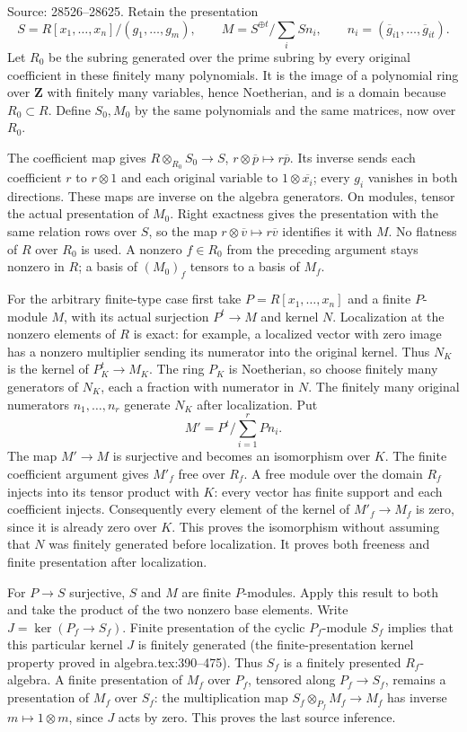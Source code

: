 Source: 28526--28625. Retain the presentation \[
 S=R[x_1,\ldots,x_n]/(g_1,\ldots,g_m),\qquad
 M=S^{\oplus t}/\sum_i S n_i,\qquad
 n_i=(\overline g_{i1},\ldots,\overline g_{it}).
\] Let \(R_0\) be the subring generated over the prime subring by every original coefficient in these finitely many polynomials. It is the image of a polynomial ring over \(\mathbf Z\) with finitely many variables, hence Noetherian, and is a domain because \(R_0\subset R\). Define \(S_0,M_0\) by the same polynomials and the same matrices, now over \(R_0\).

The coefficient map gives \(R\otimes_{R_0}S_0\to S\), \(r\otimes \overline p\mapsto r\overline p\). Its inverse sends each coefficient \(r\) to \(r\otimes1\) and each original variable to \(1\otimes\overline{x_i}\); every \(g_i\) vanishes in both directions. These maps are inverse on the algebra generators. On modules, tensor the actual presentation of \(M_0\). Right exactness gives the presentation with the same relation rows over \(S\), so the map \(r\otimes\overline v\mapsto r\overline v\) identifies it with \(M\). No flatness of \(R\) over \(R_0\) is used. A nonzero \(f\in R_0\) from the preceding argument stays nonzero in \(R\); a basis of \((M_0)_f\) tensors to a basis of \(M_f\).

For the arbitrary finite-type case first take \(P=R[x_1,\ldots,x_n]\) and a finite \(P\)-module \(M\), with its actual surjection \(P^t\to M\) and kernel \(N\). Localization at the nonzero elements of \(R\) is exact: for example, a localized vector with zero image has a nonzero multiplier sending its numerator into the original kernel. Thus \(N_K\) is the kernel of \(P_K^t\to M_K\). The ring \(P_K\) is Noetherian, so choose finitely many generators of \(N_K\), each a fraction with numerator in \(N\). The finitely many original numerators \(n_1,\ldots,n_r\) generate \(N_K\) after localization. Put \[
 M'=P^t/\sum_{i=1}^r Pn_i.
\] The map \(M'\to M\) is surjective and becomes an isomorphism over \(K\). The finite coefficient argument gives \(M'_f\) free over \(R_f\). A free module over the domain \(R_f\) injects into its tensor product with \(K\): every vector has finite support and each coefficient injects. Consequently every element of the kernel of \(M'_f\to M_f\) is zero, since it is already zero over \(K\). This proves the isomorphism without assuming that \(N\) was finitely generated before localization. It proves both freeness and finite presentation after localization.

For \(P\to S\) surjective, \(S\) and \(M\) are finite \(P\)-modules. Apply this result to both and take the product of the two nonzero base elements. Write \(J=\ker(P_f\to S_f)\). Finite presentation of the cyclic \(P_f\)-module \(S_f\) implies that this particular kernel \(J\) is finitely generated (the finite-presentation kernel property proved in algebra.tex:390--475). Thus \(S_f\) is a finitely presented \(R_f\)-algebra. A finite presentation of \(M_f\) over \(P_f\), tensored along \(P_f\to S_f\), remains a presentation of \(M_f\) over \(S_f\): the multiplication map \(S_f\otimes_{P_f}M_f\to M_f\) has inverse \(m\mapsto1\otimes m\), since \(J\) acts by zero. This proves the last source inference.


